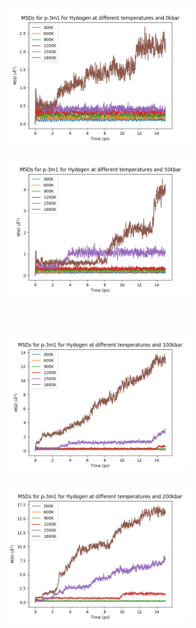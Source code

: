 \documentclass[a4paper,12pt]{article}
\begin{document}
\begin{figure}[h!!!!!!!!!!!!!!!!!!!!!]
	\centering
	\begin{subfigure}[t]{0.5\textwidth}
		\centering
		\includegraphics[width=7cm]{figures/p3m1_msd_H_p0.png}
		\label{Fig8a}
	\end{subfigure}%
	\begin{subfigure}[t]{0.5\textwidth}
		\centering
		\includegraphics[width=7cm]{figures/p3m1_msd_H_p50.png}
		\label{Fig8b}
	\end{subfigure}%
\\
	\begin{subfigure}[t]{0.5\textwidth}
	\centering
	\includegraphics[width=7cm]{figures/p3m1_msd_H_p100.png}
	\label{Fig8c}
\end{subfigure}%
	\begin{subfigure}[t]{0.5\textwidth}
	\centering
	\includegraphics[width=7cm]{figures/p3m1_msd_H_p200.png}

\end{subfigure}
\end{figure}
\end{document}
